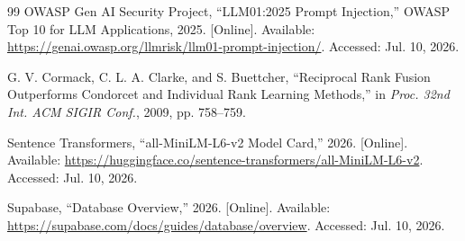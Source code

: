 \documentclass[conference]{IEEEtran}
\begin{document}
\begin{thebibliography}{99}
 OWASP Gen AI Security Project, ``LLM01:2025 Prompt Injection,'' OWASP Top 10 for LLM Applications, 2025. [Online]. Available: \url{https://genai.owasp.org/llmrisk/llm01-prompt-injection/}. Accessed: Jul. 10, 2026.

 G. V. Cormack, C. L. A. Clarke, and S. Buettcher, ``Reciprocal Rank Fusion Outperforms Condorcet and Individual Rank Learning Methods,'' in \emph{Proc. 32nd Int. ACM SIGIR Conf.}, 2009, pp. 758--759.

 Sentence Transformers, ``all-MiniLM-L6-v2 Model Card,'' 2026. [Online]. Available: \url{https://huggingface.co/sentence-transformers/all-MiniLM-L6-v2}. Accessed: Jul. 10, 2026.

 Supabase, ``Database Overview,'' 2026. [Online]. Available: \url{https://supabase.com/docs/guides/database/overview}. Accessed: Jul. 10, 2026.

\end{thebibliography}
\end{document}
